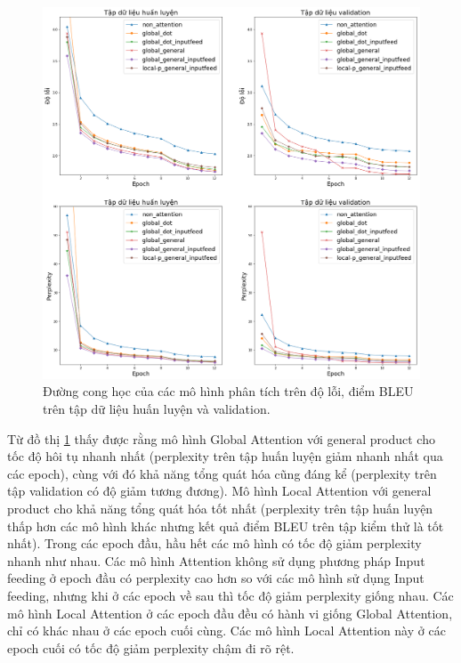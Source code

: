 \begin{figure}
	\centering
	\includegraphics[width=1.0\textwidth]{train_valid_xent_ppl_scaled.png}
	\caption[Đường cong học của các mô hình]{Đường cong học của các mô hình phân tích trên độ lỗi, điểm BLEU trên tập dữ liệu huấn luyện và validation.}
	\label{fig_learning_curve}
\end{figure}

Từ đồ thị \ref{fig_learning_curve} thấy được rằng mô hình Global Attention với general product cho tốc độ hôi tụ nhanh nhất (perplexity trên tập huấn luyện giảm nhanh nhất qua các epoch), cùng với đó khả năng tổng quát hóa cũng đáng kể (perplexity trên tập validation có độ giảm tương đương). Mô hình Local Attention với general product cho khả năng tổng quát hóa tốt nhất (perplexity trên tập huấn luyện thấp hơn các mô hình khác nhưng kết quả điểm BLEU trên tập kiểm thử là tốt nhất). Trong các epoch đầu, hầu hết các mô hình có tốc độ giảm perplexity nhanh như nhau. Các mô hình Attention không sử dụng phương pháp Input feeding ở epoch đầu có perplexity cao hơn so với các mô hình sử dụng Input feeding, nhưng khi ở các epoch về sau thì tốc độ giảm perplexity giống nhau. Các mô hình Local Attention ở các epoch đầu đều có hành vi giống Global Attention, chỉ có khác nhau ở các epoch cuối cùng. Các mô hình Local Attention này ở các epoch cuối có tốc độ giảm perplexity chậm đi rõ rệt.

